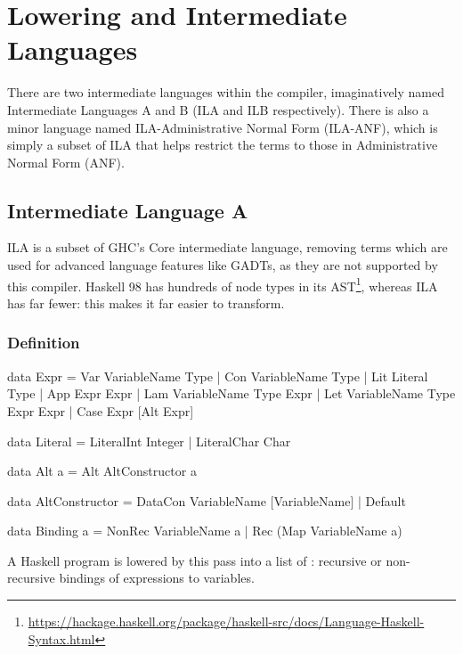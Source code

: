 \documentclass[dissertation.tex]{subfiles}
\begin{document}
\section{Lowering and Intermediate Languages}
{
    There are two intermediate languages within the compiler, imaginatively named Intermediate Languages A and B (ILA and ILB respectively). There is also a minor language named ILA-Administrative Normal Form (ILA-ANF), which is simply a subset of ILA that helps restrict the terms to those in Administrative Normal Form (ANF).

    \subsection{Intermediate Language A}
    {
        ILA is a subset of GHC's Core intermediate language, removing terms which are used for advanced language features like GADTs, as they are not supported by this compiler. Haskell 98 has hundreds of node types in its AST\footnote{\url{https://hackage.haskell.org/package/haskell-src/docs/Language-Haskell-Syntax.html}}, whereas ILA has far fewer: this makes it far easier to transform.

        \subsubsection{Definition}
        {
            \begin{haskellfigure}
            data Expr = Var VariableName Type
                      | Con VariableName Type
                      | Lit Literal Type
                      | App Expr Expr
                      | Lam VariableName Type Expr
                      | Let VariableName Type Expr Expr
                      | Case Expr [Alt Expr]

            data Literal = LiteralInt Integer
                         | LiteralChar Char

            data Alt a = Alt AltConstructor a

            data AltConstructor = DataCon VariableName [VariableName]
                                | Default

            data Binding a = NonRec VariableName a
                           | Rec (Map VariableName a)
            \end{haskellfigure}

            A Haskell program is lowered by this pass into a list of : recursive or non-recursive bindings of expressions to variables.

}}}
\end{document}
